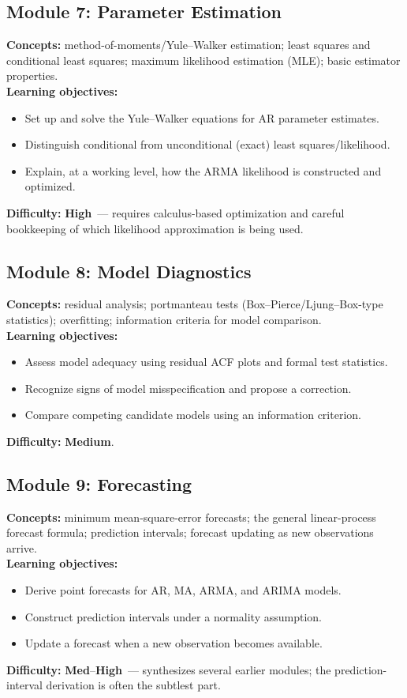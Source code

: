 \documentclass[11pt]{article}
\newcommand{\Med}{\textcolor{diffMed}{\textbf{Medium}}}
\newcommand{\High}{\textcolor{diffHigh}{\textbf{High}}}
\newcommand{\MedHigh}{\textcolor{diffMed}{\textbf{Med}}--\textcolor{diffHigh}{\textbf{High}}}
\newcommand{\module}[2]{\subsection*{Module #1: #2}}
\begin{document}
\module{7}{Parameter Estimation}
\textbf{Concepts:} method-of-moments/Yule--Walker estimation; least squares and conditional least
squares; maximum likelihood estimation (MLE); basic estimator properties.\\
\textbf{Learning objectives:}
\begin{itemize}
  \item Set up and solve the Yule--Walker equations for AR parameter estimates.
  \item Distinguish conditional from unconditional (exact) least squares/likelihood.
  \item Explain, at a working level, how the ARMA likelihood is constructed and optimized.
\end{itemize}
\textbf{Difficulty:} \High\ --- requires calculus-based optimization and careful bookkeeping of which
likelihood approximation is being used.

\module{8}{Model Diagnostics}
\textbf{Concepts:} residual analysis; portmanteau tests (Box--Pierce/Ljung--Box-type statistics);
overfitting; information criteria for model comparison.\\
\textbf{Learning objectives:}
\begin{itemize}
  \item Assess model adequacy using residual ACF plots and formal test statistics.
  \item Recognize signs of model misspecification and propose a correction.
  \item Compare competing candidate models using an information criterion.
\end{itemize}
\textbf{Difficulty:} \Med.

\module{9}{Forecasting}
\textbf{Concepts:} minimum mean-square-error forecasts; the general linear-process forecast formula;
prediction intervals; forecast updating as new observations arrive.\\
\textbf{Learning objectives:}
\begin{itemize}
  \item Derive point forecasts for AR, MA, ARMA, and ARIMA models.
  \item Construct prediction intervals under a normality assumption.
  \item Update a forecast when a new observation becomes available.
\end{itemize}
\textbf{Difficulty:} \MedHigh\ --- synthesizes several earlier modules; the prediction-interval
derivation is often the subtlest part.
\end{document}
